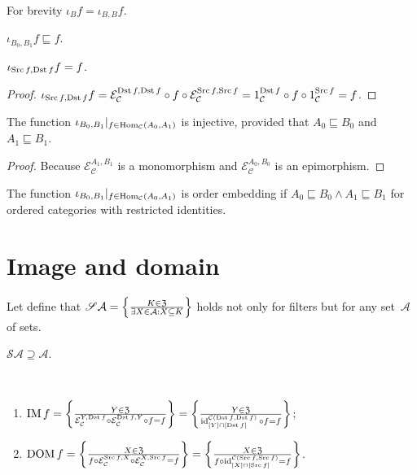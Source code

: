 For brevity $\iota_B f = \iota_{B, B} f$.

\begin{obvious}
$\iota_{B_0, B_1} f\sqsubseteq f$.
\end{obvious}

\begin{prop}
  $\iota_{\operatorname{Src} f, \operatorname{Dst} f} f = f$.
\end{prop}

\begin{proof}
  $\iota_{\operatorname{Src} f, \operatorname{Dst} f} f = \mathcal{E}_\mathcal{C}^{\operatorname{Dst} f,\operatorname{Dst} f} \circ f \circ \mathcal{E}_\mathcal{C}^{\operatorname{Src} f,\operatorname{Src} f} =
  1_{\mathcal{C}}^{\operatorname{Dst} f} \circ f \circ 1_{\mathcal{C}}^{\operatorname{Src} f} = f$.
\end{proof}

\begin{prop}
  The function $\iota_{B_0, B_1} |_{f \in \operatorname{Hom}_{\mathcal{C}} (A_0 ,
  A_1)}$ is injective, provided that
  $A_0\sqsubseteq B_0$ and $A_1\sqsubseteq B_1$.
\end{prop}

\begin{proof}
  Because $\mathcal{E}_{\mathcal{C}}^{A_1,B_1}$ is a monomorphism and $\mathcal{E}_{\mathcal{C}}^{A_0,B_0}$ is an epimorphism.
\end{proof}

\begin{cor}\label{iota-emb}
  The function $\iota_{B_0, B_1} |_{f \in \operatorname{Hom}_{\mathcal{C}} (A_0 ,
  A_1)}$ is order embedding if $A_0 \sqsubseteq B_0 \wedge A_1 \sqsubseteq B_1$ for ordered categories
  with restricted identities.
\end{cor}

\section{Image and domain}

Let define that
$\mathscr{S}\mathcal{A}=\left\{ \frac{K\in\mathfrak{Z}}{
\exists X\in\mathcal{A}:X\subseteq K}\right\}$
holds not only for filters but for any set~$\mathcal{A}$ of
sets.

\begin{obvious}
$\mathscr{S}\mathcal{A}\supseteq\mathcal{A}$.
\end{obvious}

\begin{defn}
~
\begin{enumerate}
\item $\operatorname{IM} f = \left\{ \frac{Y \in \mathfrak{Z}}{\mathcal{E}_{\mathcal{C}}^{Y, \operatorname{Dst} f} \circ \mathcal{E}_{\mathcal{C}}^{\operatorname{Dst} f,
Y} \circ f = f}\right\} = \left\{ \frac{Y \in \mathfrak{Z}}{\operatorname{id}^{\mathcal{C}(\operatorname{Dst} f,\operatorname{Dst} f)}_{[Y]\sqcap[\operatorname{Dst} f]} \circ f = f}\right\}$;
\item $\operatorname{DOM} f = \left\{ \frac{X \in \mathfrak{Z}}{f\circ\mathcal{E}_{\mathcal{C}}^{\operatorname{Src} f, X} \circ \mathcal{E}_{\mathcal{C}}^{X, \operatorname{Src} f} = f}\right\} = \left\{ \frac{X \in \mathfrak{Z}}{f \circ \operatorname{id}^{\mathcal{C}(\operatorname{Src} f,\operatorname{Src} f)}_{[X]\sqcap[\operatorname{Src} f]} = f}\right\}$.
\end{enumerate}
\end{defn}

